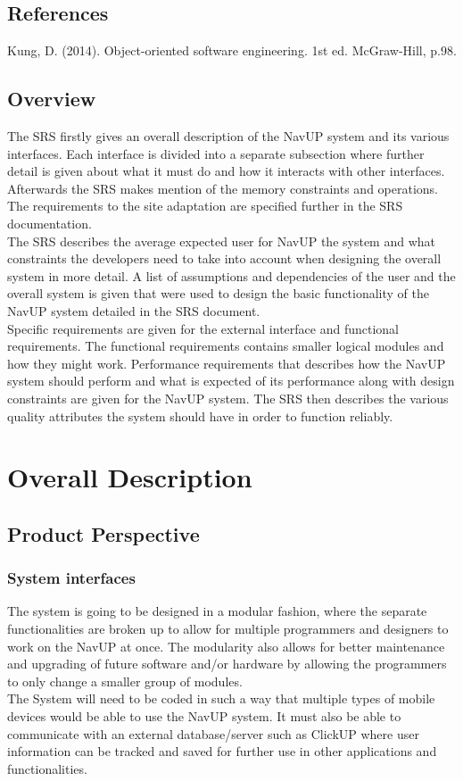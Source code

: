 \documentclass[a4paper,12pt]{article}
\begin{document}
\subsection{References}
 Kung, D. (2014). Object-oriented software engineering. 1st ed. McGraw-Hill, p.98.
\subsection{Overview}
The SRS firstly gives an overall description of the NavUP system and its various interfaces. Each interface is divided into a separate subsection where further detail is given about what it must do and how it interacts with other interfaces. Afterwards the SRS makes mention of the memory constraints and operations. The requirements to the site adaptation are specified further in the SRS documentation.\\
The SRS describes the average expected user for NavUP the system and what constraints the developers need to take into account when designing the overall system in more detail. A list of assumptions and dependencies of the user and the overall system is given that were used to design the basic functionality of the NavUP system detailed in the SRS document.\\
Specific requirements are given for the external interface and functional requirements. The functional requirements contains smaller logical modules and how they might work. Performance requirements that describes how the NavUP system should perform and what is expected of its performance along with design constraints are given for the NavUP system. The SRS then describes the various quality attributes the system should have in order to function reliably.
\section{Overall Description}
\subsection{Product Perspective}
\subsubsection{System interfaces}
The system is going to be designed in a modular fashion, where the separate functionalities are broken up to allow for multiple programmers and designers to work on the NavUP at once. The modularity also allows for better maintenance and upgrading of future software and/or hardware by allowing the programmers to only change a smaller group of modules.\\
The System will need to be coded in such a way that multiple types of mobile devices would be able to use the NavUP system. It must also be able to communicate with an external database/server such as ClickUP where user information can be tracked and saved for further use in other applications and functionalities.
\end{document}
